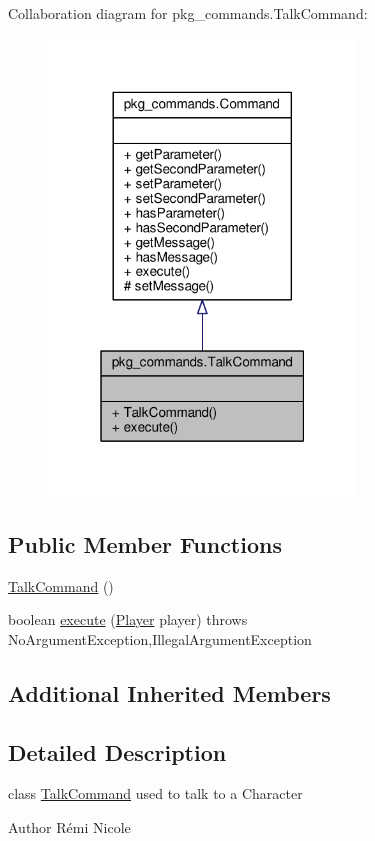 Collaboration diagram for pkg\-\_\-commands.\-Talk\-Command\-:
\nopagebreak
\begin{figure}[H]
\begin{center}
\leavevmode
\includegraphics[width=232pt]{classpkg__commands_1_1TalkCommand__coll__graph}
\end{center}
\end{figure}
\subsection*{Public Member Functions}
\begin{DoxyCompactItemize}
\item 
\hyperlink{classpkg__commands_1_1TalkCommand_aafa1679affe7c5622c30806837e8fb90}{Talk\-Command} ()
\item 
boolean \hyperlink{classpkg__commands_1_1TalkCommand_a413573388e24a2d442f9814695f7e47c}{execute} (\hyperlink{classpkg__world_1_1Player}{Player} player)  throws No\-Argument\-Exception,\-Illegal\-Argument\-Exception 
\end{DoxyCompactItemize}
\subsection*{Additional Inherited Members}


\subsection{Detailed Description}
class \hyperlink{classpkg__commands_1_1TalkCommand}{Talk\-Command} used to talk to a Character \begin{DoxyAuthor}{Author}
Rémi Nicole 
\end{DoxyAuthor}


